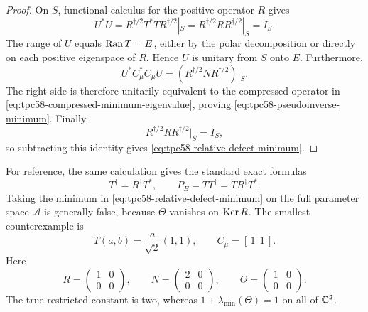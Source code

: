 \begin{proof}
On \(S\), functional calculus for the positive operator \(R\) gives
\begin{equation}
 U^*U
 =R^{\dagger/2}T^*TR^{\dagger/2}|_S
 =R^{\dagger/2}RR^{\dagger/2}|_S
 =I_S.
 \label{eq:tpc58-polar-isometry}
\end{equation}
The range of \(U\) equals \(\operatorname{Ran} T=E\), either by the polar decomposition
or directly on each positive eigenspace of \(R\).  Hence \(U\) is unitary
from \(S\) onto \(E\).  Furthermore,
\begin{equation}
 U^*C_\mu^*C_\mu U
 =(R^{\dagger/2}NR^{\dagger/2})|_S.
 \label{eq:tpc58-unitary-gram-equivalence}
\end{equation}
The right side is therefore unitarily equivalent to the compressed operator
in \eqref{eq:tpc58-compressed-minimum-eigenvalue}, proving
\eqref{eq:tpc58-pseudoinverse-minimum}.  Finally,
\begin{equation}
 R^{\dagger/2}RR^{\dagger/2}|_S=I_S,
 \label{eq:tpc58-pseudoinverse-support-identity}
\end{equation}
so subtracting this identity gives
\eqref{eq:tpc58-relative-defect-minimum}.
\end{proof}

For reference, the same calculation gives the standard exact formulas
\begin{equation}
 T^\dagger=R^\dagger T^*,
 \qquad
 P_E=TT^\dagger=TR^\dagger T^*.
 \label{eq:tpc58-moore-penrose-projector}
\end{equation}
Taking the minimum in
\eqref{eq:tpc58-relative-defect-minimum} on the full parameter space
\(\mathcal A\) is generally false, because \(\Theta\) vanishes on
\(\operatorname{Ker} R\).  The smallest counterexample is
\begin{equation}
 T(a,b)=\frac{a}{\sqrt2}(1,1),
 \qquad C_\mu=[\,1\ \ 1\,].
 \label{eq:tpc58-pseudoinverse-support-counterexample}
\end{equation}
Here
\begin{equation}
 R=\begin{pmatrix}1&0\\0&0\end{pmatrix},
 \qquad
 N=\begin{pmatrix}2&0\\0&0\end{pmatrix},
 \qquad
 \Theta=\begin{pmatrix}1&0\\0&0\end{pmatrix}.
 \label{eq:tpc58-pseudoinverse-counterexample-matrices}
\end{equation}
The true restricted constant is two, whereas
\(1+\lambda_{\min}(\Theta)=1\) on all of \(\mathbb C^2\).

